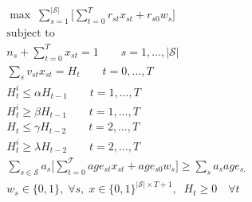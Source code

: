 \documentclass[forests,article,submit,moreauthors,pdftex]{Definitions/mdpi}
\begin{document}
\begingroup
\allowdisplaybreaks
\begin{align}
    & \max \; \sum_{s =1 }^{|\mathcal{S}|} \Bigg[ \sum_{t=0}^{{T}} r_{st}x_{st}  + r_{s0} w_s \Bigg]\label{eq:obj_2_det}\\
& \text{subject to} \nonumber\\
    & n_s + \sum_{t=0}^T x_{st} = 1 \quad \quad  s=1,\dots, |\mathcal{S}| \label{eq:one_harvest_det}\\
    & \sum_s v_{st} x_{st} = H_{t} \quad \quad   t = 0, \dots, T \label{eq:compute_v_others_det}\\
    & H_t^{i} \le \alpha H_{t-1} \quad \quad   t=1, \dots, T \label{eq:vol_flu_low_det}\\
    & H_t^{i} \ge \beta H_{t-1} \quad \quad  t=1, \dots, T \label{eq:vol_flu_high_det}\\
     & H_t \le \gamma H_{t-2} \quad \quad   t=2, \dots, T \label{eq:vol_flu_low2_det}\\
    & H_t^{i} \ge \lambda H_{t-2} \quad \quad  t=2, \dots, T \label{eq:vol_flu_high2_det}\\
    & \sum_{s\in \mathcal{S}}a_s\Bigg[\sum_{t=0}^{\mathcal{T}} age_{st} x_{st} + age_{s0}w_{s}\Bigg] \ge \sum_s a_s age_{s.} \label{eq:age_end_det}\\
    & w_s \in \{0, 1\}, \; \forall s, \; x \in \{0, 1\}^{|\mathcal{S}| \times T+1}, \; \; H_{t} \ge 0 \quad \forall t \label{eq:var_definition_det}
\end{align}
\endgroup


%  

\end{document}

